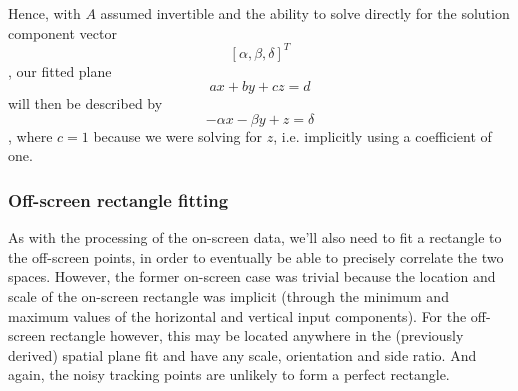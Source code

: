Hence, with $A$ assumed invertible and the ability to solve directly for the solution component vector $$[\alpha, \beta, \delta]^T$$, our fitted plane $$ax+by+cz=d$$ will then be described by $$-\alpha x - \beta y + z = \delta$$, where $c=1$ because we were solving for $z$, i.e. implicitly using a coefficient of one. 

\subsubsection{Off-screen rectangle fitting}

As with the processing of the on-screen data, we'll also need to fit a rectangle to the off-screen points, in order to eventually be able to precisely correlate the two spaces. However, the former on-screen case was trivial because the location and scale of the on-screen rectangle was implicit (through the minimum and maximum values of the horizontal and vertical input components). For the off-screen rectangle however, this may be located anywhere in the (previously derived) spatial plane fit and have any scale, orientation and side ratio. And again, the noisy tracking  points are unlikely to form a perfect rectangle. 

%
%




